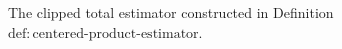 The clipped total estimator constructed in Definition~\(\mathrm{def:centered\text{-}product\text{-}estimator}\).